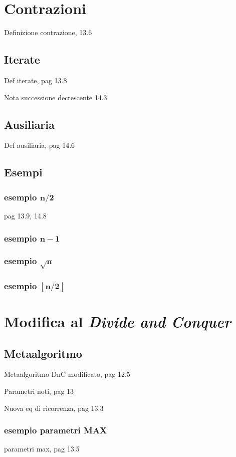 \section{Contrazioni}
Definizione contrazione, 13.6

\subsection{Iterate}
Def iterate, pag 13.8

Nota successione decrescente 14.3

\subsection{Ausiliaria}
Def ausiliaria, pag 14.6

\subsection{Esempi}
\subsubsection{ esempio $\bm{n/2}$}
pag 13.9, 14.8

\subsubsection{ esempio $\bm{n-1}$}
\subsubsection{ esempio $\bm{\sqrt{n}}$}
\subsubsection{ esempio $\bm{\left\lfloor n/2 \right\rfloor}$}

\section{Modifica al \textit{Divide and Conquer}}
\subsection{Metaalgoritmo}
Metaalgoritmo DnC modificato, pag 12.5

Parametri noti, pag 13

Nuova eq di ricorrenza, pag 13.3

\subsubsection{esempio parametri MAX}
parametri max, pag 13.5

